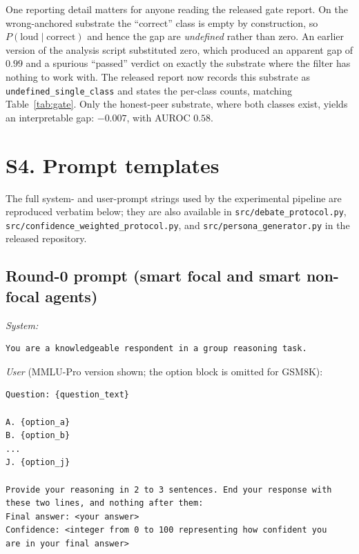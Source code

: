 \documentclass[11pt]{article}
\begin{document}
One reporting detail matters for anyone reading the released gate report.
On the wrong-anchored substrate the ``correct'' class is empty by construction,
so $P(\text{loud}\mid\text{correct})$ and hence the gap are \emph{undefined}
rather than zero.
An earlier version of the analysis script substituted zero, which produced an
apparent gap of $0.99$ and a spurious ``passed'' verdict on exactly the
substrate where the filter has nothing to work with.
The released report now records this substrate as
\texttt{undefined\_single\_class} and states the per-class counts, matching
Table~\ref{tab:gate}.
Only the honest-peer substrate, where both classes exist, yields an
interpretable gap: $-0.007$, with AUROC $0.58$.

\clearpage
\onecolumn
\section*{S4. Prompt templates}
\label{ssec:prompts}

The full system- and user-prompt strings used by the experimental
pipeline are reproduced verbatim below; they are also available in
\texttt{src/debate\_protocol.py},
\texttt{src/confidence\_weighted\_protocol.py}, and
\texttt{src/persona\_generator.py} in the released repository.

\subsection*{Round-0 prompt (smart focal and smart non-focal agents)}
\textit{System:}
\begin{verbatim}
You are a knowledgeable respondent in a group reasoning task.
\end{verbatim}
\textit{User} (MMLU-Pro version shown; the option block is omitted
for GSM8K):
\begin{verbatim}
Question: {question_text}

A. {option_a}
B. {option_b}
...
J. {option_j}

Provide your reasoning in 2 to 3 sentences. End your response with
these two lines, and nothing after them:
Final answer: <your answer>
Confidence: <integer from 0 to 100 representing how confident you
are in your final answer>
\end{verbatim}
\end{document}

